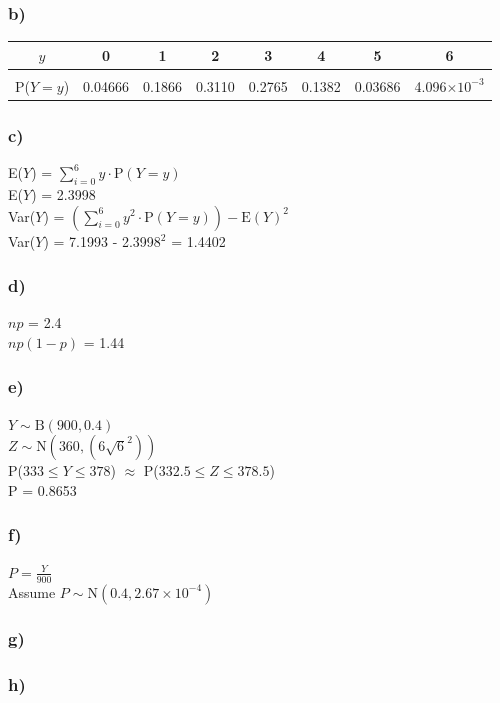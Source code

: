 \documentclass[]{article}
\begin{document}
\subsubsection{b)}
\begin{tabular}{c|c|c|c|c|c|c|c}
    $y$&0&1&2&3&4&5&6\\
    \hline
    \\[\dimexpr-\normalbaselineskip+4pt]
    P($Y=y$)&0.04666&0.1866&0.3110&0.2765&0.1382&0.03686&4.096$\times10^{-3}$
\end{tabular}
\subsubsection{c)}
E($Y$) = $\sum_{i=0}^{6} y \cdot \textrm{P}(Y=y)$
\\
E($Y$) = 2.3998 
\\
Var($Y$) = $\left(\sum_{i=0}^{6} y^2 \cdot \textrm{P}(Y=y)\right) - \textrm{E}(Y)^2$
\\
Var($Y$) = 7.1993 - 2.3998$^2$ = 1.4402
\subsubsection{d)}
$np$ = 2.4
\\
$np(1-p)$ = 1.44
\subsubsection{e)}
$Y \sim \textrm{B}(900,0.4)$
\\
$Z \sim \textrm{N}(360,(6\sqrt{6}^2))$
\\
P($333 \leq Y \leq 378$) $\approx$ P($332.5 \leq Z \leq 378.5$)
\\
P = 0.8653
\subsubsection{f)}
$P = \frac{Y}{900}$
\\
Assume $P \sim \textrm{N}(0.4, 2.67\times 10^{-4})$
\\
\subsubsection{g)}
\subsubsection{h)}
\end{document}
